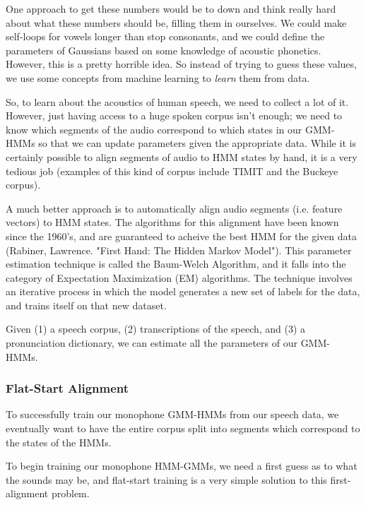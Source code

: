 \documentclass[10pt,a4paper]{article}
\begin{document}
One approach to get these numbers would be to down and think really hard about what these numbers should be, filling them in ourselves. We could make self-loops for vowels longer than stop consonants, and we could define the parameters of Gaussians based on some knowledge of acoustic phonetics. However, this is a pretty horrible idea. So instead of trying to guess these values, we use some concepts from machine learning to \textit{learn} them from data.

So, to learn about the acoustics of human speech, we need to collect a lot of it. However, just having access to a huge spoken corpus isn't enough; we need to know which segments of the audio correspond to which states in our GMM-HMMs so that we can update parameters given the appropriate data. While it is certainly possible to align segments of audio to HMM states by hand, it is a very tedious job (examples of this kind of corpus include TIMIT and the Buckeye corpus).

A much better approach is to automatically align audio segments (i.e. feature vectors) to HMM states. The algorithms for this alignment have been known since the 1960's, and are guaranteed to acheive the best HMM for the given data (Rabiner, Lawrence. "First Hand: The Hidden Markov Model"). This parameter estimation technique is called the Baum-Welch Algorithm, and it falls into the category of Expectation Maximization (EM) algorithms. The technique involves an iterative process in which the model generates a new set of labels for the data, and trains itself on that new dataset.

Given (1) a speech corpus, (2) transcriptions of the speech, and (3) a pronunciation dictionary, we can estimate all the parameters of our GMM-HMMs.

\subsubsection*{Flat-Start Alignment}
  
To successfully train our monophone GMM-HMMs from our speech data, we eventually want to have the entire corpus split into segments which correspond to the states of the HMMs.

To begin training our monophone HMM-GMMs, we need a first guess as to what the sounds may be, and flat-start training is a very simple solution to this first-alignment problem.

\end{document}
